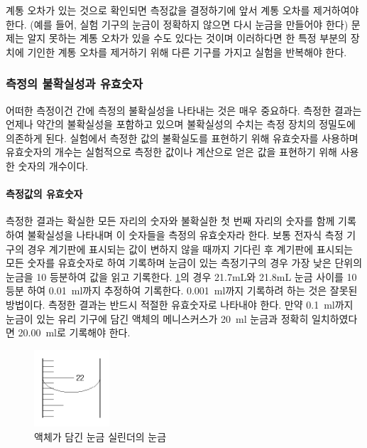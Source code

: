 \documentclass{GSHS-chemexp}
\begin{document}
	계통 오차가 있는 것으로 확인되면 측정값을 결정하기에 앞서
	계통 오차를 제거하여야 한다.
	(예를 들어, 실험 기구의 눈금이 정확하지 않으면
	다시 눈금을 만들어야 한다)
	문제는 알지 못하는 계통 오차가 있을 수도 있다는 것이며
	이러하다면 한 특정 부분의 장치에 기인한 계통 오차를
	제거하기 위해 다른 기구를 가지고 실험을 반복해야 한다.
	
	\subsubsection{측정의 불확실성과 유효숫자}
	어떠한 측정이건 간에 측정의 불확실성을 나타내는 것은 매우 중요하다.
	측정한 결과는 언제나 약간의 불확실성을 포함하고 있으며
	불확실성의 수치는 측정 장치의 정밀도에 의존하게 된다.
	실험에서 측정한 값의 불확실도를 표현하기 위해 유효숫자를 사용하며
	유효숫자의 개수는 실험적으로 측정한 값이나 계산으로 얻은 값을
	표현하기 위해 사용한 숫자의 개수이다.
		
	\paragraph{측정값의 유효숫자}
	측정한 결과는 확실한 모든 자리의 숫자와
	불확실한 첫 번째 자리의 숫자를 함께 기록하여
	불확실성을 나타내며 이 숫자들을 측정의 유효숫자라 한다.
	보통 전자식 측정 기구의 경우 계기판에 표시되는 값이
	변하지 않을 때까지 기다린 후 계기판에 표시되는 모든 숫자를
	유효숫자로 하여 기록하며 눈금이 있는 측정기구의 경우
	가장 낮은 단위의 눈금을 10 등분하여 값을 읽고 기록한다.
	\ref{fig:gradation}의 경우 21.7mL와 21.8mL 눈금 사이를
	10 등분 하여 \SI{0.01}{\milli\litre}까지 추정하여 기록한다.
	\SI{0.001}{\milli\litre}까지 기록하려 하는 것은
	잘못된 방법이다.
	측정한 결과는 반드시 적절한 유효숫자로 나타내야 한다.
	만약 \SI{0.1}{\milli\litre}까지 눈금이 있는 유리 기구에
	담긴 액체의 메니스커스가 \SI{20}{\milli\litre} 눈금과
	정확히 일치하였다면 \SI{20.00}{\milli\litre}로 기록해야 한다.
	\begin{figure}[H]
		\centering
		\includegraphics[width=0.25\textwidth]{Gradation.png}
		\caption{액체가 담긴 눈금 실린더의 눈금}
		\label{fig:gradation}
	\end{figure}
		
\end{document}
